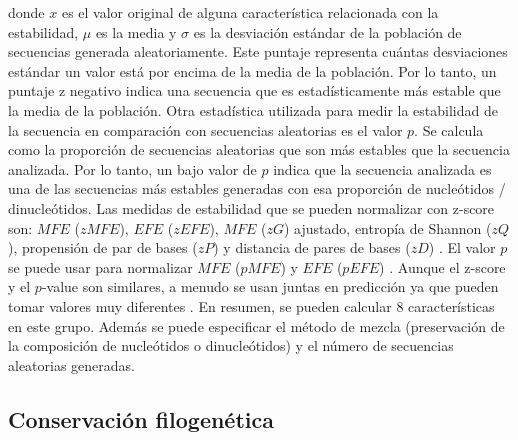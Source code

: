 \noindent donde $x$ es el valor original de alguna característica relacionada con la estabilidad, $\mu$ es la media y $\sigma$ es la desviación estándar de
la población de secuencias generada aleatoriamente. Este puntaje representa cuántas desviaciones estándar un valor está por encima de la media de la
población. Por lo tanto, un puntaje z negativo indica una secuencia que es estadísticamente más estable que la media de la población. Otra estadística
utilizada para medir la estabilidad de la secuencia en comparación con secuencias aleatorias es el valor $p$. Se calcula como la proporción de secuencias
aleatorias que son más estables que la secuencia analizada. Por lo tanto, un bajo valor de $p$ indica que la secuencia analizada es una de las secuencias más
estables generadas con esa proporción de nucleótidos / dinucleótidos. Las medidas de estabilidad que se pueden normalizar con z-score son: $ MFE $ ($ zMFE
$), $ EFE $ ($ zEFE $), $ MFE $ ($ zG $) ajustado, entropía de Shannon ($ zQ $), propensión de par de bases ($ zP $) \citep{ng2007novo} y distancia de pares de
bases ($ zD $) \citep{ding2010mirensvm}. El valor $p$ se puede usar para normalizar $ MFE $ ($ pMFE $) \citep{bonnet2004evidence} y $ EFE $ ($ pEFE $) \citep{ding2010mirensvm}. Aunque
el z-score y el $p$-value son similares, a menudo se usan juntas en predicción ya que pueden tomar valores muy diferentes \citep{ding2010mirensvm}. En resumen,
se pueden calcular 8 características en este grupo. Además se puede especificar el método de mezcla (preservación de la composición de nucleótidos o
dinucleótidos) y el número de secuencias aleatorias generadas.

\subsection{Conservación filogenética}

